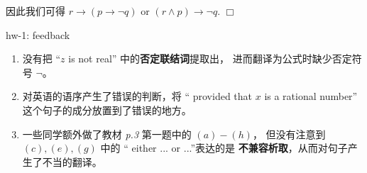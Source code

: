 \documentclass[UTF8,12pt,a4paper]{ctexart}
\begin{document}
\indent 
因此我们可得
 $r \to (p \to \neg q)$ or $(r \land p) \to \neg q$.
\hfill $\Box$


\vspace{1em}
\dotfill hw-1: feedback 
\dotfill

\begin{enumerate}
\item 没有把 “$z$ is {\color{purple} not} real” 中的\textbf{否定联结词}提取出，
进而翻译为公式时缺少否定符号 $\neg$。

\item 对英语的语序产生了错误的判断，将 “{\color{purple} provided that} $x$ is a rational number” 这个句子的成分放置到了错误的地方。

\item 一些同学额外做了教材 \textit{p.3} 第一题中的 $(a)-(h)$， 
但没有注意到 $(c),(e),(g)$ 中的 “{\color{purple} either} ... {\color{purple} or} ...”表达的是
\textbf{不兼容析取}，从而对句子产生了不当的翻译。
\end{enumerate}
\end{document}
